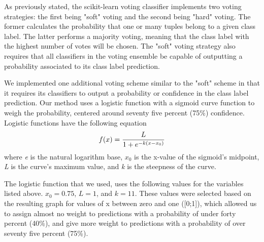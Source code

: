 
As previously stated, the scikit-learn voting classifier implements two voting strategies: the first being "soft" voting and the second being "hard" voting. The former calculates the probability that one or many tuples belong to a given class label. The latter performs a majority voting, meaning that the class label with the highest number of votes will be chosen.
The "soft" voting strategy also requires that all classifiers in the voting ensemble be capable of outputting a probability associated to its class label prediction.

We implemented one additional voting scheme similar to the "soft" scheme in that it requires its classifiers to output a probability or confidence in the class label prediction. Our method uses a logistic function with a sigmoid curve function to weigh the probability, centered around seventy five percent (75\%) confidence.
Logistic functions have the following equation
\begin{equation}
    f(x)=\frac{L}{1+e^{-k(x-x_0)}}\\ 
    \label{eq:logistic_function}
\end{equation}
where \textit{e} is the natural logarithm base, \textit{$x_0$} is the x-value of the sigmoid's midpoint, \textit{L} is the curve's maximum value, and \textit{k} is the steepness of the curve.

The logistic function that we used, uses the following values for the variables listed above. $x_0=0.75$, $L=1$, and $k=11$. These values were selected based on the resulting graph for values of x between zero and one ([0;1]), which allowed us to assign almost no weight to predictions with a probability of under forty percent (40\%), and give more weight to predictions with a probability of over seventy five percent (75\%).

